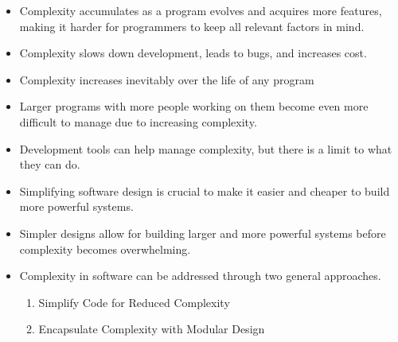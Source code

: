 
{ 
	
	
	\begin{itemize}
		\item	Complexity accumulates as a program evolves and acquires more features, making it harder for programmers to keep all relevant factors in mind.
		\item	Complexity slows down development, leads to bugs, and increases cost.
		\item	Complexity increases inevitably over the life of any program
		\item	Larger programs with more people working on them become even more difficult to manage due to increasing complexity.
		
		
		
		
		
	\end{itemize}
}

\medskip

{ 
	
	
	\begin{itemize}
		\item	Development tools can help manage complexity, but there is a limit to what they can do.
		
		\item Simplifying software design is crucial to make it easier and cheaper to build more powerful systems.
		
		\item Simpler designs allow for building larger and more powerful systems before complexity becomes overwhelming.
		
		

	\end{itemize}
}


{ 
	
	
	\begin{itemize}
		\item Complexity in software can be addressed through two general approaches.
		\begin{enumerate}
	\item	Simplify Code for Reduced Complexity
		
	\item	Encapsulate Complexity with Modular Design
		
  	\end{enumerate}
		
	\end{itemize}
}
\medskip

